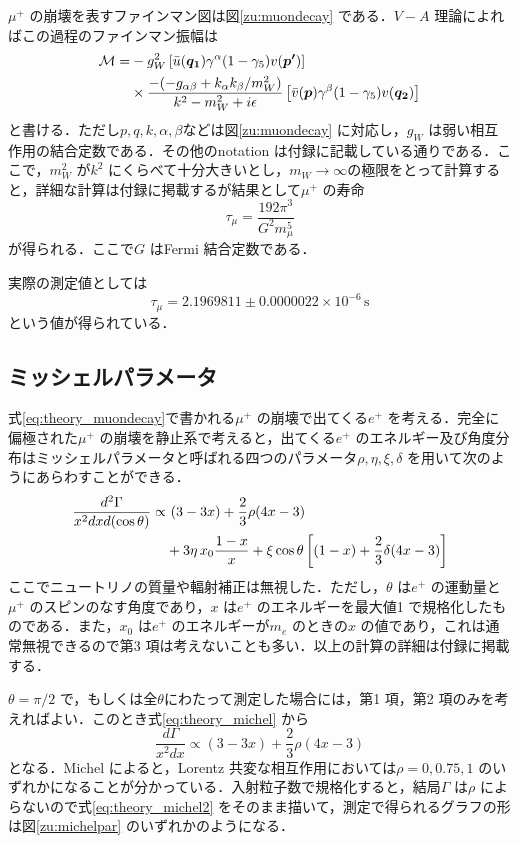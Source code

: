 	$\mu^{+}$ の崩壊を表すファインマン図は図\ref{zu:muondecay} である．$V - A$ 理論によればこの過程のファインマン振幅は
	\begin{align}
	\mathcal{M} = &-g_{W}^2\left[\Bar{u}(\bm{q_{1}})\gamma^{\alpha}(1 - \gamma_{5})v(\bm{p'})\right] \notag \\ 
	&\times \frac{-(-g_{\alpha\beta} + k_{\alpha}k_{\beta}/m_{W}^2)}{k^{2} - m_{W}^2 + i\epsilon}\left[\Bar{v}(\bm{p})\gamma^{\beta}(1 - \gamma_5)v(\bm{q_{2}})\right]
	\label{eq:theory_muondecayamp}
	\end{align}
	と書ける．ただし$p, q, k, \alpha, \beta$などは図\ref{zu:muondecay} に対応し，$g_{W}$ は弱い相互作用の結合定数である．その他のnotation は付録に記載している通りである．ここで，$m_{W}^2$ が$k^2$ にくらべて十分大きいとし，$m_{W} \rightarrow \infty$の極限をとって計算すると，詳細な計算は付録に掲載するが結果として$\mu^+$ の寿命
	\begin{equation}
	\tau_{\mu} = \frac{192\pi^3}{G^{2} m_{\mu}^{5}}
	\end{equation}
	が得られる．ここで$G$ はFermi 結合定数である．

	実際の測定値としては
	\[\tau_{\mu} = 2.1969811 \pm 0.0000022 \times 10^{-6} \,\mathrm{s}\]
	という値が得られている．%
	
	\subsection{ミッシェルパラメータ}
	式\eqref{eq:theory_muondecay}で書かれる$\mu^{+}$ の崩壊で出てくる$e^{+}$ を考える．完全に偏極された$\mu^{+}$ の崩壊を静止系で考えると，出てくる$e^{+}$ のエネルギー及び角度分布はミッシェルパラメータと呼ばれる四つのパラメータ$\rho, \eta, \xi, \delta$ を用いて次のようにあらわすことができる．%
	\begin{align}
	\frac{d^2\Gamma}{x^{2}dxd(\cos \theta)} \propto& \,\,(3 - 3x) + \frac{2}{3}\rho (4x - 3) \notag \\
	&+ 3 \eta \,x_{0} \frac{1-x}{x} + \xi \cos \theta \left[(1 - x) + \frac{2}{3} \delta (4x - 3)\right]
	\label{eq:theory_michel}
	\end{align}
	ここでニュートリノの質量や輻射補正は無視した．ただし，$\theta$ は$e^{+}$ の運動量と$\mu^{+}$ のスピンのなす角度であり，$x$ は$e^{+}$ のエネルギーを最大値1 で規格化したものである．また，$x_0$ は$e^{+}$ のエネルギーが$m_{e}$ のときの$x$ の値であり，これは通常無視できるので第3 項は考えないことも多い．以上の計算の詳細は付録に掲載する．

	$\theta = \pi/2$ で，もしくは全$\theta$にわたって測定した場合には，第1 項，第2 項のみを考えればよい．このとき式\eqref{eq:theory_michel} から
	\begin{equation}
	\frac{d\Gamma}{x^{2}dx} \propto (3 - 3x) + \frac{2}{3}\rho (4x - 3)
	\label{eq:theory_michel2}
	\end{equation}
	となる．Michel %
によると，Lorentz 共変な相互作用においては$\rho = 0, 0.75, 1$ のいずれかになることが分かっている．入射粒子数で規格化すると，結局$\Gamma$ は$\rho$ によらないので式\eqref{eq:theory_michel2} をそのまま描いて，測定で得られるグラフの形は図\ref{zu:michelpar} のいずれかのようになる．


